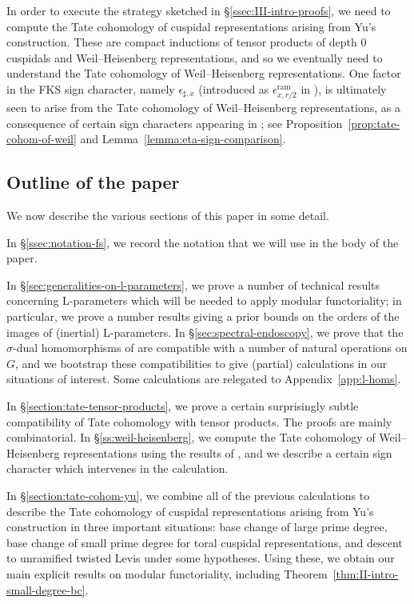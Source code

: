 \documentclass[reqno]{amsart}
\numberwithin{equation}{subsection}
\theoremstyle{remark}
\numberwithin{equation}{subsection}
\numberwithin{figure}{subsection}
\begin{document}
In order to execute the strategy sketched in \S \ref{ssec:III-intro-proofs}, we need to compute the Tate cohomology of cuspidal representations arising from Yu's construction. These are compact inductions of tensor products of depth 0 cuspidals and Weil--Heisenberg representations, and so we eventually need to understand the Tate cohomology of Weil--Heisenberg representations. One factor in the FKS sign character, namely $\epsilon_{\sharp,x}$ (introduced as $\epsilon_{x,r/2}^{\mathrm{ram}}$ in \cite[\S 4.3]{DS18}), is ultimately seen to arise from the Tate cohomology of Weil--Heisenberg representations, as a consequence of certain sign characters appearing in \cite{Ger77}; see Proposition~\ref{prop:tate-cohom-of-weil} and Lemma~\ref{lemma:eta-sign-comparison}. 



\subsection{Outline of the paper}

We now describe the various sections of this paper in some detail.

In \S\ref{ssec:notation-fs}, we record the notation that we will use in the body of the paper.

In \S\ref{sec:generalities-on-l-parameters}, we prove a number of technical results concerning L-parameters which will be needed to apply modular functoriality; in particular, we prove a number results giving a prior bounds on the orders of the images of (inertial) L-parameters. In \S\ref{sec:spectral-endoscopy}, we prove that the $\sigma$-dual homomorphisms of \cite{F24} are compatible with a number of natural operations on $G$, and we bootstrap these compatibilities to give (partial) calculations in our situations of interest. Some calculations are relegated to Appendix~\ref{app:l-homs}.

In \S\ref{section:tate-tensor-products}, we prove a certain surprisingly subtle compatibility of Tate cohomology with tensor products. The proofs are mainly combinatorial. In \S\ref{ss:weil-heisenberg}, we compute the Tate cohomology of Weil--Heisenberg representations using the results of \cite{Ger77}, and we describe a certain sign character which intervenes in the calculation.

In \S\ref{section:tate-cohom-yu}, we combine all of the previous calculations to describe the Tate cohomology of cuspidal representations arising from Yu's construction in three important situations: base change of large prime degree, base change of small prime degree for toral cuspidal representations, and descent to unramified twisted Levis under some hypotheses. Using these, we obtain our main explicit results on modular functoriality, including Theorem~\ref{thm:II-intro-small-degree-bc}.
\end{document}
